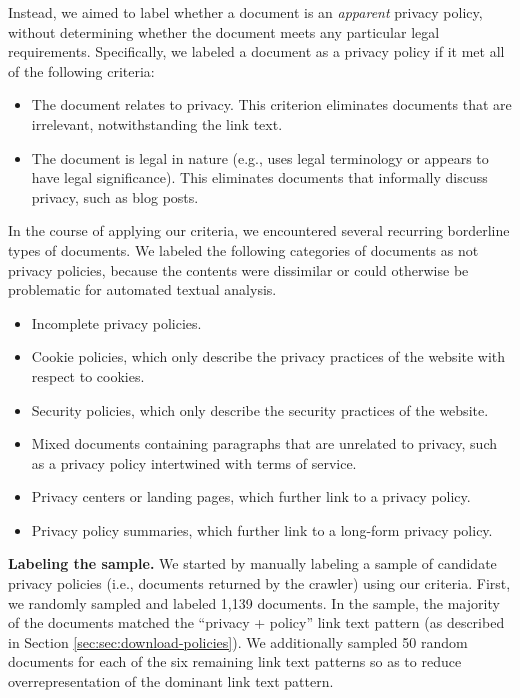 Instead, we aimed to label whether a document is an \textit{apparent} privacy policy, without determining whether the document meets any particular legal requirements. Specifically, we labeled a document as a privacy policy if it met all of the following criteria:
\begin{itemize}
    \item The document relates to privacy. This criterion eliminates documents that are irrelevant, notwithstanding the link text.
    \item The document is legal in nature (e.g., uses legal terminology or appears to have legal significance). This eliminates documents that informally discuss privacy, such as blog posts.
\end{itemize}
In the course of applying our criteria, we encountered several recurring borderline types of documents. We labeled the following categories of documents as not privacy policies, because the contents were dissimilar or could otherwise be problematic for automated textual analysis.
\begin{itemize}
\item Incomplete privacy policies.

\item Cookie policies, which only describe the privacy practices of the website with respect to cookies.

\item Security policies, which only describe the security practices of the website.

\item Mixed documents containing paragraphs that are unrelated to privacy, such as a privacy policy intertwined with terms of service.

\item Privacy centers or landing pages, which further link to a privacy policy.

\item Privacy policy summaries, which further link to a long-form privacy policy.

\end{itemize}

\textbf{Labeling the sample.} We started by manually labeling a sample of candidate privacy policies (i.e., documents returned by the crawler) using our criteria. First, we randomly sampled and labeled 1,139 documents. In the sample, the majority of the documents 
matched the ``privacy + policy'' link text pattern (as described in Section \ref{sec:sec:download-policies}). We additionally sampled 50 random documents for each of the six remaining link text patterns so as to reduce overrepresentation of the 
dominant
link text pattern.

